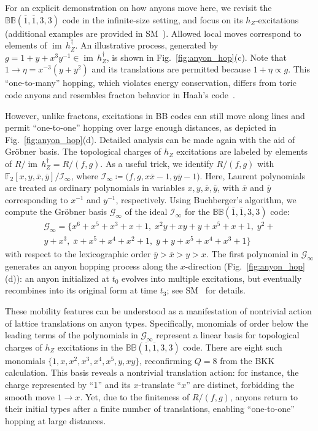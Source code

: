 \documentclass[aps,prl,english,superscriptaddress,twocolumn,tightenlines,showpacs,longbibliography,floatfix,amsfonts]{revtex4-2}
\newcommand{\im}[1]{{\operatorname{im} \, #1}}
\begin{document}
	
	For an explicit demonstration on how anyons move here, we revisit the $\mathbb{BB}(\overline{1},\overline{1},3,3)$ code in the infinite-size setting, and focus on its $h_Z$-excitations (additional examples are provided in SM~\cite{SM1}).
	Allowed local moves correspond to elements of $\im{h_Z^\dagger}$.
	An illustrative process, generated by $g=1+y+x^{3}y^{-1} \in \im{h_Z^\dagger}$, is shown in Fig.~\ref{fig:anyon_hop}(c). Note that $1\rightarrow \eta=x^{-3}(y+y^{2})$ and its translations are permitted because $1+\eta\propto g$.
	This “one-to-many” hopping, which violates energy conservation, differs from toric code anyons and resembles fracton behavior in Haah’s code~\cite{Haah11,Vijay16,Song24}.
	
	However, unlike fractons, excitations in BB codes can still move along lines and permit ``one-to-one'' hopping over large enough distances, as depicted in Fig.~\ref{fig:anyon_hop}(d). Detailed analysis can be made again with the aid of Gr\"obner basis. The topological charges of $h_Z$ excitations are labeled by elements of $R/\im h_Z^\dagger = R/(f,g)$.
	As a useful trick, we identify $R/(f,g)$ with $\mathbb{F}_2[x,y,\overline{x},\overline{y}]/\mathcal{I}_\infty$, where $\mathcal{I}_{\infty} \coloneqq \big(f,g,x\overline{x}-1, y\overline{y}-1\big)$. Here, Laurent polynomials are treated as ordinary polynomials in variables $x,y,\overline{x},\overline{y}$, with $\overline{x}$ and $\overline{y}$ corresponding to $x^{-1}$ and $y^{-1}$, respectively. Using Buchberger's algorithm, we compute the Gr\"obner basis $\mathcal{G}_{\infty}$ of the ideal $\mathcal{I}_\infty$ for the $\mathbb{BB}(\overline{1},\overline{1},3,3)$ code:
	\begin{multline}\label{eq:GB_33}
		\mathcal{G}_\infty=\{x^{6}+x^{5}+x^{3}+x+1,\;x^{2}y+xy+y+x^{5}+x+1,\;y^{2}+\\
		y+x^{3},\;\overline{x}+x^{5}+x^{4}+x^{2}+1,\;\overline{y}+y+x^{5}+x^{4}+x^{3}+1\}
	\end{multline}
	with respect to the lexicographic order $\overline{y}>\overline{x}>y>x$. 
	The first polynomial in $\mathcal{G}_\infty$ generates an anyon hopping process along the 
	$x$-direction (Fig.~\ref{fig:anyon_hop}(d)): an anyon initialized at $t_0$ evolves into multiple excitations, but eventually recombines into its original form at time $t_3$; see SM~\cite{SM1} for details.
	
	
	These mobility features can be understood as a manifestation of nontrivial action of lattice translations on anyon types. 
	Specifically, monomials of order below the leading terms of the polynomials in $\mathcal{G}_\infty$ represent a linear basis for topological charges of $h_Z$ excitations in the  $\mathbb{BB}(\overline{1},\overline{1},3,3)$ code.
	There are eight such monomials $\{1,x,x^{2},x^{3},x^{4},x^{5},y,xy\}$,
	reconfirming $Q=8$ from the BKK calculation. 
	This basis reveals a nontrivial translation action: for instance, the charge represented by 
	``1'' and its $x$-translate ``$x$'' are distinct, forbidding the smooth move $1\rightarrow x$.
	Yet, due to the finiteness of $R/(f,g)$, anyons return to their initial types after a finite number of translations, enabling “one-to-one” hopping at large distances. 
	
\end{document}
